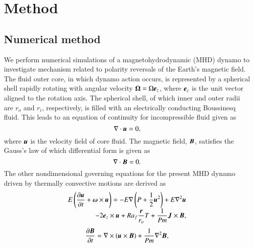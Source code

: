 \section{Method}
\label{section:method}

\subsection{Numerical method}

We perform numerical simulations of a magnetohydrodynamic (MHD) dynamo to investigate  mechanism related to polarity reversals of the Earth's magnetic field.
The fluid outer core, in which dynamo action occurs, is represented by a spherical shell rapidly rotating with angular velocity ${\bf \Omega} = \Omega \mbox{\boldmath$e$}_z$, where $\mbox{\boldmath$e$}_z$ is the unit vector aligned to the rotation axis.
The spherical shell, of which inner and outer radii are $r_o$ and $r_i$, respectively, is filled with an electrically conducting Boussinesq fluid. This leads to an equation of continuity for incompressible fluid given as
%
\begin{equation}
\nabla \cdot \mbox{\boldmath$u$} = 0,
\label{eq:divu=0}
\end{equation}
%
where $\mbox{\boldmath$u$}$ is the velocity field of core fluid.
The magnetic field, $\mbox{\boldmath$B$}$, satisfies the Gauss's law of which differential form is given as
%
\begin{equation}
\nabla \cdot \mbox{\boldmath$B$} = 0.
\label{eq:divB=0}
\end{equation}
%
The other nondimensional governing equations for the present MHD dynamo driven by thermally convective motions are derived as
%
\begin{equation}
\begin{array}{l}
\displaystyle
E \left( \frac{\partial\bvec{u}}{\partial t} +
 \bvec{\omega} \times \bvec{u} \right) =
 - E \nabla \left( P + \frac{1}{2} \bvec{u}^2 \right)
 + E \nabla^2 \bvec{u}
\\
\displaystyle
\hspace*{\fill}
 -2 \bvec{e}_z \times \bvec{u}
 + Ra_f \frac{\bvec{r}}{r_o} T
 + \frac{1}{Pm} \bvec{J} \times \bvec{B} ,
\end{array}
\label{eq:momentum}
\end{equation}
%
\begin{equation}
\frac{\partial \mbox{\boldmath$B$}}{\partial t} =
 \nabla \times (\mbox{\boldmath$u$} \times \mbox{\boldmath$B$} )
 + \frac{1}{Pm} \nabla^2 \mbox{\boldmath$B$} ,
\label{eq:induction}
\end{equation}
